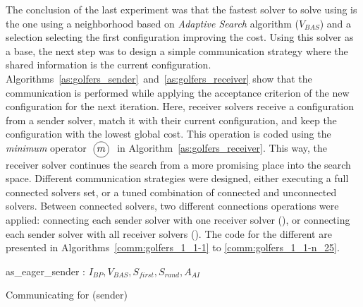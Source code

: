 \separation

The conclusion of the last experiment was that the fastest solver to solve \SGP{} using \posl{} is the one using a neighborhood \om{} based on {\it Adaptive Search} algorithm ($V_{BAS}$) and a selection \om{} selecting the first configuration improving the cost. Using this solver as a base, the next step was to design a simple communication strategy where the shared information is the current configuration. Algorithms~\ref{as:golfers_sender}~and~\ref{as:golfers_receiver} show that the communication is performed while applying the acceptance criterion of the new configuration for the next iteration. Here, receiver solvers receive a configuration from a sender solver, match it with their current configuration, and keep the configuration with the lowest global cost. This operation is coded using the \textit{minimum} operator $\poslop{m}$ in Algorithm~\ref{as:golfers_receiver}. This way, the receiver solver continues the search from a more promising place into the search space. Different communication strategies were designed, either executing a full connected solvers set, or a tuned combination of connected and unconnected solvers. Between connected solvers, two different connections operations were applied: connecting each sender solver with one receiver solver (\oneTone), or connecting each sender solver with all receiver solvers (\oneTn). The code for the different \commstrs{} are presented in Algorithms~\ref{comm:golfers_1_1-1} to \ref{comm:golfers_1_1-n_25}. 

\begin{algorithm}[t]
\dontprintsemicolon
\SetNoline
{}
   as\_eager\_sender\;
\algoindent {} : $I_{BP}, V_{BAS}, S_{first}, S_{rand}, A_{AI}$ \;
\caption{Communicating \as{} for \SGP{} (sender)}\label{as:golfers_sender}
\end{algorithm}

